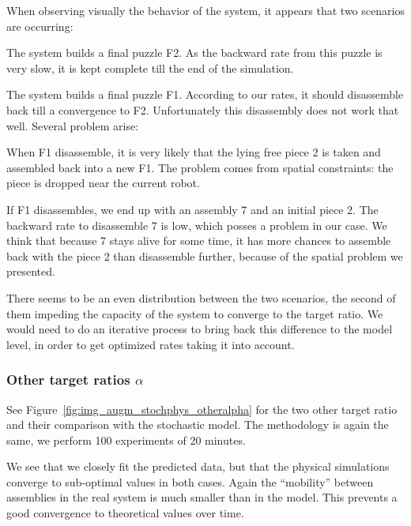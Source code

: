 		When observing visually the behavior of the system, it appears that two scenarios are occurring:
		\begin{my_enumerate}
			\item The system builds a final puzzle F2. As the backward rate from this puzzle is very slow, it is kept complete till the end of the simulation.
			\item The system builds a final puzzle F1. According to our rates, it should disassemble back till a convergence to F2. Unfortunately this disassembly does not work that well. Several problem arise:
				\begin{my_itemize}
					\item When F1 disassemble, it is very likely that the lying free piece 2 is taken and assembled back into a new F1. The problem comes from spatial constraints: the piece is dropped near the current robot.
					\item If F1 disassembles, we end up with an assembly 7 and an initial piece 2. The backward rate to disassemble 7 is low, which posses a problem in our case. We think that because 7 stays alive for some time, it has more chances to assemble back with the piece 2 than disassemble further, because of the spatial problem we presented.
				\end{my_itemize}
		\end{my_enumerate}
		
		There seems to be an even distribution between the two scenarios, the second of them impeding the capacity of the system to converge to the target ratio. We would need to do an iterative process to bring back this difference to the model level, in order to get optimized rates taking it into account.
		
		\subsubsection{Other target ratios $\alpha$} %
		\label{ssub:other_target_ratios_alpha_}

			
			See Figure~\ref{fig:img_augm_stochphys_otheralpha} for the two other target ratio and their comparison with the stochastic model. The methodology is again the same, we perform 100 experiments of 20 minutes.
			
			We see that we closely fit the predicted data, but that the physical simulations converge to sub-optimal values in both cases. Again the ``mobility'' between assemblies in the real system is much smaller than in the model. This prevents a good convergence to theoretical values over time.
			
